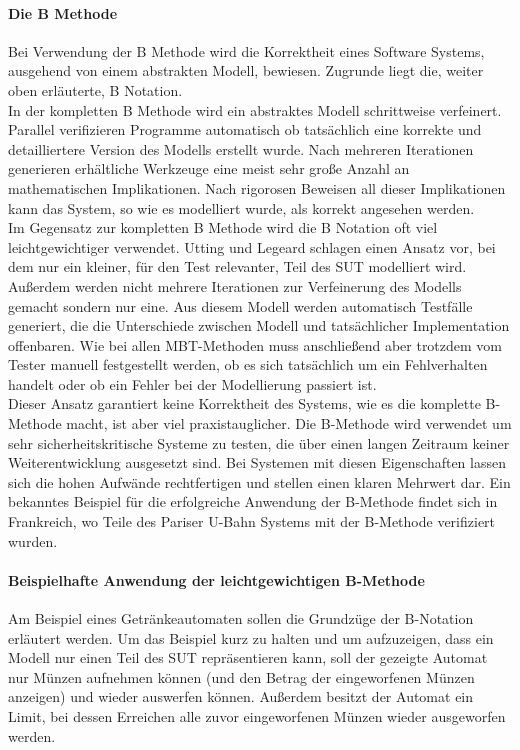 \paragraph{Die B Methode}
\label{sec:bmethod}
Bei Verwendung der B Methode wird die Korrektheit eines Software Systems, ausgehend von einem abstrakten Modell, bewiesen. Zugrunde liegt die, weiter oben erläuterte, B Notation.\\
In der kompletten B Methode wird ein abstraktes Modell schrittweise verfeinert. Parallel verifizieren Programme automatisch ob tatsächlich eine korrekte und detailliertere Version des Modells erstellt wurde. Nach mehreren Iterationen generieren erhältliche Werkzeuge eine meist sehr große Anzahl an mathematischen Implikationen. Nach rigorosen Beweisen all dieser Implikationen kann das System, so wie es modelliert wurde, als korrekt angesehen werden.\\
Im Gegensatz zur kompletten B Methode wird die B Notation oft viel leichtgewichtiger verwendet. Utting und Legeard\cite{utting_practical_2007} schlagen einen Ansatz vor, bei dem nur ein kleiner, für den Test relevanter, Teil des \Gls{SUT} modelliert wird. Außerdem werden nicht mehrere Iterationen zur Verfeinerung des Modells gemacht sondern nur eine. Aus diesem Modell werden automatisch Testfälle generiert, die die Unterschiede zwischen Modell und tatsächlicher Implementation offenbaren. Wie bei allen MBT-Methoden muss anschließend aber trotzdem vom Tester manuell festgestellt werden, ob es sich tatsächlich um ein Fehlverhalten handelt oder ob ein Fehler bei der Modellierung passiert ist.\\
Dieser Ansatz garantiert keine Korrektheit des Systems, wie es die komplette B-Methode macht, ist aber viel praxistauglicher. Die B-Methode wird verwendet um sehr sicherheitskritische Systeme zu testen, die über einen langen Zeitraum keiner Weiterentwicklung ausgesetzt sind. Bei Systemen mit diesen Eigenschaften lassen sich die hohen Aufwände rechtfertigen und stellen einen klaren Mehrwert dar. Ein bekanntes Beispiel für die erfolgreiche Anwendung der B-Methode findet sich in Frankreich, wo Teile des Pariser U-Bahn Systems mit der B-Methode verifiziert wurden. \cite{lecomte_formal_2007}

\paragraph{Beispielhafte Anwendung der leichtgewichtigen B-Methode}
Am Beispiel eines Getränkeautomaten sollen die Grundzüge der B-Notation erläutert werden. Um das Beispiel kurz zu halten und um aufzuzeigen, dass ein Modell nur einen Teil des \Gls{SUT} repräsentieren kann, soll der gezeigte Automat nur Münzen aufnehmen können (und den Betrag der eingeworfenen Münzen anzeigen) und wieder auswerfen können. Außerdem besitzt der Automat ein Limit, bei dessen Erreichen alle zuvor eingeworfenen Münzen wieder ausgeworfen werden.

